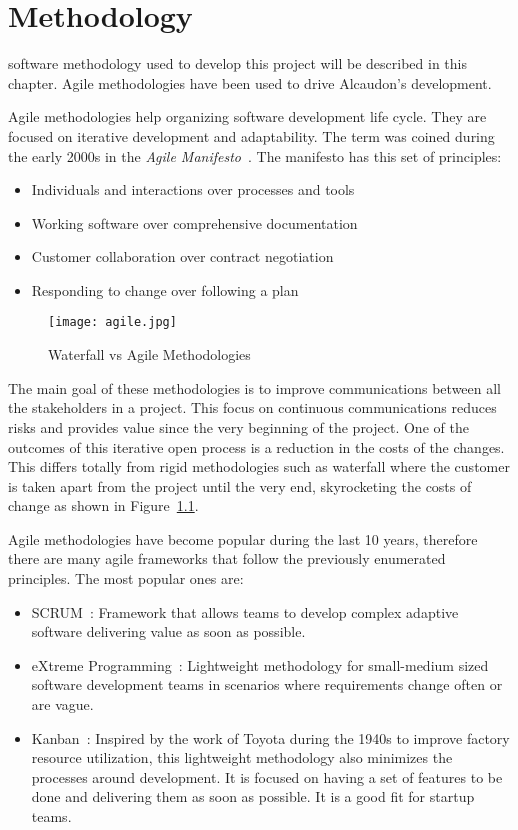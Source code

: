 \chapter{Methodology}
\label{chap:methodology}

 software methodology used to develop this project will be described in this
chapter. Agile methodologies have been used to drive Alcaudon's development.

Agile methodologies help organizing software development life cycle. They are
focused on iterative development and adaptability. The term was coined during
the early 2000s in the \textit{Agile Manifesto}~\cite{manifesto}. The manifesto
has this set of principles:

\begin{itemize}
\item Individuals and interactions over processes and tools
\item Working software over comprehensive documentation
\item Customer collaboration over contract negotiation
\item Responding to change over following a plan
\end{itemize}


\begin{figure}
  \centering
  \texttt{[image: agile.jpg]}
  \caption{Waterfall vs Agile Methodologies~\cite{waterfall}}
  \label{fig:waterfall}
\end{figure}

The main goal of these methodologies is to improve communications between all
the stakeholders in a project. This focus on continuous communications reduces
risks and provides value since the very beginning of the project. One of the
outcomes of this iterative open process is a reduction in the costs of the
changes. This differs totally from rigid methodologies such as waterfall where
the customer is taken apart from the project until the very end, skyrocketing
the costs of change as shown in Figure~\ref{fig:waterfall}.

Agile methodologies have become popular during the last 10 years, therefore there
are many agile frameworks that follow the previously enumerated principles. The
most popular ones are:
\begin{itemize}
\item SCRUM~\cite{scrum}: Framework that allows teams to develop complex
  adaptive software delivering value as soon as possible.
\item eXtreme Programming~\cite{xp}: Lightweight methodology for small-medium
  sized software development teams in scenarios where requirements change often
  or are vague.
\item Kanban~\cite{kanban}: Inspired by the work of Toyota during the 1940s to improve
  factory resource utilization, this lightweight methodology also minimizes the processes
  around development. It is focused on having a set of features to be done and delivering
  them as soon as possible. It is a good fit for startup teams.
\end{itemize}

